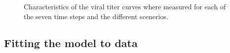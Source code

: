 \begin{figure}
\begin{minipage}{\linewidth}
    \caption{Characteristics of the viral titer curves where measured for each of the seven time steps and the different scenerios.\label{fig_AspectGraphs}}
\end{minipage}
\end{figure}

\subsection{Fitting the model to data}

